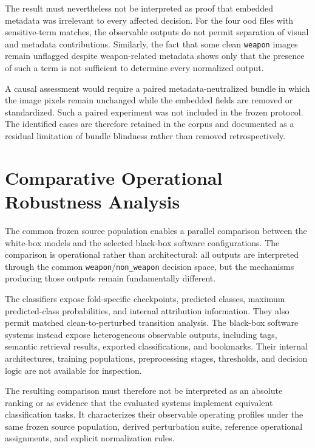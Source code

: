 The result must nevertheless not be interpreted as proof that embedded metadata
was irrelevant to every affected decision. For the four \gls{ood} files with
sensitive-term matches, the observable outputs do not permit separation of
visual and metadata contributions. Similarly, the fact that some clean
\texttt{weapon} images remain unflagged despite weapon-related metadata shows
only that the presence of such a term is not sufficient to determine every
normalized output.

A causal assessment would require a paired metadata-neutralized bundle in which
the image pixels remain unchanged while the embedded fields are removed or
standardized. Such a paired experiment was not included in the frozen protocol.
The identified cases are therefore retained in the corpus and documented as a
residual limitation of bundle blindness rather than removed retrospectively.
\section{Comparative Operational Robustness Analysis}
\label{sec:results-comparative}

The common frozen source population enables a parallel comparison between the
white-box models and the selected black-box software configurations.
The comparison is operational rather than architectural: all outputs are
interpreted through the common \texttt{weapon}/\texttt{non\_weapon} decision
space, but the mechanisms producing those outputs remain fundamentally
different.

The classifiers expose fold-specific checkpoints, predicted classes, maximum
predicted-class probabilities, and internal attribution information. They also
permit matched clean-to-perturbed transition analysis. The black-box software
systems instead expose heterogeneous observable outputs, including tags,
semantic retrieval results, exported classifications, and bookmarks. Their
internal architectures, training populations, preprocessing stages, thresholds,
and decision logic are not available for inspection.

The resulting comparison must therefore not be interpreted as an absolute
ranking or as evidence that the evaluated systems implement equivalent
classification tasks. It characterizes their observable operating profiles
under the same frozen source population, derived perturbation suite, reference
operational assignments, and explicit normalization rules.

